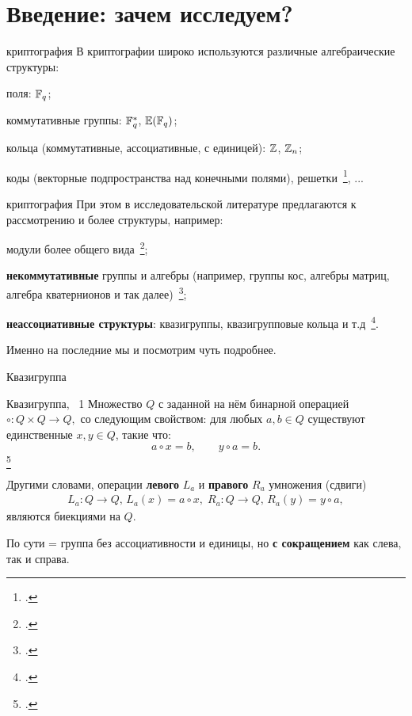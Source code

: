 \section{Введение: зачем исследуем?}


\begin{frame}{  криптография}
    В криптографии широко используются различные алгебраические структуры:
    \begin{coloritemize}
        \item поля: $\mathbb{F}_q$;
        \item коммутативные группы: $\mathbb{F}_q^*$, $\mathbb{E}(\mathbb{F}_q)$;
        \item кольца (коммутативные, ассоциативные, с единицей): $\mathbb{Z}$, $\mathbb{Z}_n$;
        \item коды (векторные подпространства над конечными полями), решетки~\footcite{pqcrypto}, ...
    \end{coloritemize}
\end{frame}


\begin{frame}{  криптография}
    При этом в исследовательской литературе предлагаются к рассмотрению и более  структуры, например:
    \begin{coloritemize}
        \item модули более общего вида~\footcite{nechaev95};
        \item \textbf{некоммутативные} группы и алгебры (например, группы кос, алгебры матриц, алгебра кватернионов и так далее)~\footcite{myasnikov2011non, romankov, moldovyan};
        \item \textbf{неассоциативные структуры}: квазигруппы, квазигрупповые кольца и т.д~\footcite{glukhov, artamonov18, markov2020nonassociative}.
    \end{coloritemize}
    Именно на последние мы и посмотрим чуть подробнее.
\end{frame}


\begin{frame}{Квазигруппа}
    \begin{myexample}{Квазигруппа, ~1}
        Множество $Q$ с заданной на нём бинарной операцией
        \(
          \circ \colon Q \times Q \to Q, 
        \)
        со следующим свойством: для любых $a, b \in Q$ существуют единственные $x, y \in Q$, такие что:
        \[
          a \circ x = b, \qquad y \circ a = b.
        \]
        \footcitetext{belousov, keedwell}
    \end{myexample}

    \pause
    Другими словами, операции \textbf{левого} $L_a$ и \textbf{правого} $R_a$ умножения (сдвиги)
    \begin{gather*}
        L_a \colon Q \to Q,\, L_a(x) = a \circ x, \; R_a \colon Q \to Q,\, R_a(y) = y \circ a,
    \end{gather*}
    являются биекциями на $Q$.
    
    \pause 
    По сути = группа без ассоциативности и единицы, но \textbf{с сокращением} как слева, так и справа.
\end{frame}


